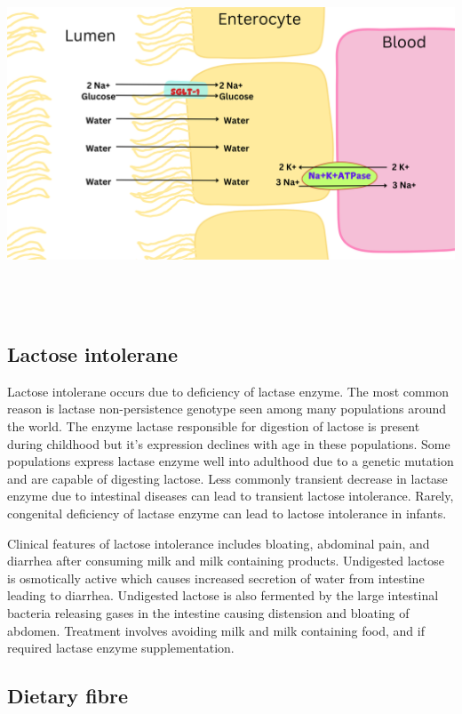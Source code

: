 \documentclass[
]{book}
\begin{document}
\includegraphics[width=\textwidth,height=4.16667in]{Images/ORS.png}

\subsection{Lactose intolerane}\label{lactose-intolerane}

Lactose intolerane occurs due to deficiency of lactase enzyme. The most common reason is lactase non-persistence genotype seen among many populations around the world. The enzyme lactase responsible for digestion of lactose is present during childhood but it's expression declines with age in these populations. Some populations express lactase enzyme well into adulthood due to a genetic mutation and are capable of digesting lactose. Less commonly transient decrease in lactase enzyme due to intestinal diseases can lead to transient lactose intolerance. Rarely, congenital deficiency of lactase enzyme can lead to lactose intolerance in infants.

Clinical features of lactose intolerance includes bloating, abdominal pain, and diarrhea after consuming milk and milk containing products. Undigested lactose is osmotically active which causes increased secretion of water from intestine leading to diarrhea. Undigested lactose is also fermented by the large intestinal bacteria releasing gases in the intestine causing distension and bloating of abdomen. Treatment involves avoiding milk and milk containing food, and if required lactase enzyme supplementation.

\subsection{Dietary fibre}\label{dietary-fibre}
\end{document}
